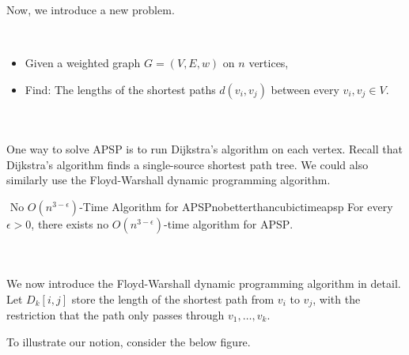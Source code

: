         Now, we introduce a new problem. 
        \begin{compprob} \label{prob:apsp}
            \vphantom
            \\
            \begin{itemize}
                \item Given a weighted graph \(G=(V,E,w)\) on \(n\) vertices,
                \item Find: The lengths of the shortest paths \(d(v_i,v_j)\) between every \(v_i,v_j\in V\).
            \end{itemize}
        \end{compprob}
        \vphantom
        \\
        \\
        One way to solve \textsc{APSP} is to run Dijkstra's algorithm on each vertex. Recall that Dijkstra's algorithm finds a single-source shortest path tree. We could also similarly use the Floyd-Warshall dynamic programming algorithm.
        \begin{hypothesis}{\Stop\,\,No \(O(n^{3-\epsilon})\)-Time Algorithm for \textsc{APSP}}{nobetterthancubictimeapsp}
            For every \(\epsilon>0\), there exists no \(O(n^{3-\epsilon})\)-time algorithm for \textsc{APSP}.
        \end{hypothesis}
        \vphantom
        \\
        \\
        We now introduce the Floyd-Warshall dynamic programming algorithm in detail. Let \(D_k[i,j]\) store the length of the shortest path from \(v_i\) to \(v_j\), with the restriction that the path only passes through \(v_1,\ldots,v_k\).
        \begin{example}
            To illustrate our notion, consider the below figure.
            \begin{center}
            \begin{tikzpicture}[shorten >=1pt,->, vertex/.style = {draw, circle}]
            \end{tikzpicture}
            \end{center}
        \end{example}
        \vphantom
